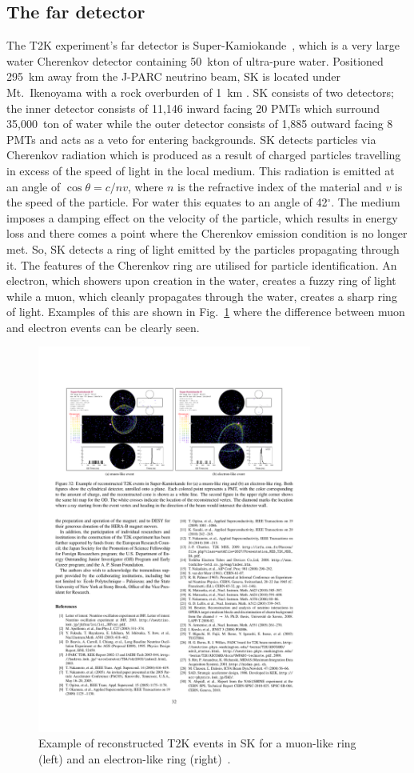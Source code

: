 \subsection{The far detector}
The T2K experiment's far detector is Super-Kamiokande~\cite{Fukuda2003418}, which is a very large water Cherenkov detector containing 50~kton of ultra-pure water.  Positioned 295~km away from the J-PARC neutrino beam, SK is located under Mt.~Ikenoyama with a rock overburden of 1~km .  SK consists of two detectors; the inner detector consists of 11,146 inward facing 20 PMTs which surround 35,000~ton of water while the outer detector consists of 1,885 outward facing 8 PMTs and acts as a veto for entering backgrounds.
\newline
\newline
SK detects particles via Cherenkov radiation which is produced as a result of charged particles travelling in excess of the speed of light in the local medium.  This radiation is emitted at an angle of $\cos \theta = c/nv$, where $n$ is the refractive index of the material and $v$ is the speed of the particle.  For water this equates to an angle of 42$^\circ$.  The medium imposes a damping effect on the velocity of the particle, which results in energy loss and there comes a point where the Cherenkov emission condition is no longer met.  So, SK detects a ring of light emitted by the particles propagating through it.
\newline
\newline
The features of the Cherenkov ring are utilised for particle identification.  An electron, which showers upon creation in the water, creates a fuzzy ring of light while a muon, which cleanly propagates through the water, creates a sharp ring of light.  Examples of this are shown in Fig.~\ref{fig:SKPID} where the difference between muon and electron events can be clearly seen.
\begin{figure}
  \centering
  \includegraphics[width=9cm]{images/t2k/SK_PID.pdf}
  \caption{Example of reconstructed T2K events in SK for a muon-like ring (left) and an electron-like ring (right)~\cite{Abe2011106}.}
  \label{fig:SKPID}
\end{figure}

